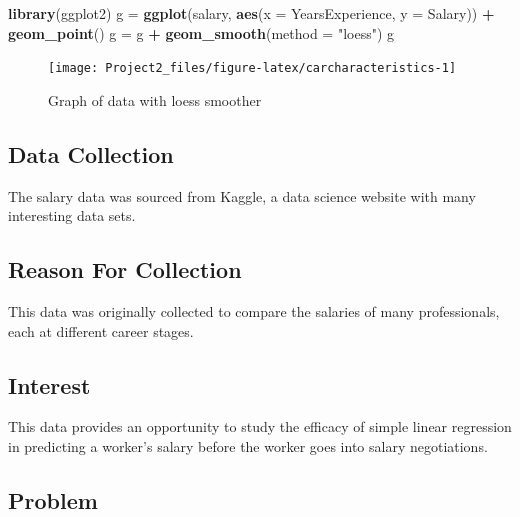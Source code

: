\documentclass[]{article}
\newenvironment{Shaded}{\begin{snugshade}}{\end{snugshade}}
\newcommand{\DataTypeTok}[1]{\textcolor[rgb]{0.13,0.29,0.53}{#1}}
\newcommand{\KeywordTok}[1]{\textcolor[rgb]{0.13,0.29,0.53}{\textbf{#1}}}
\newcommand{\NormalTok}[1]{#1}
\newcommand{\OperatorTok}[1]{\textcolor[rgb]{0.81,0.36,0.00}{\textbf{#1}}}
\newcommand{\StringTok}[1]{\textcolor[rgb]{0.31,0.60,0.02}{#1}}
\begin{document}
\begin{Shaded}
\begin{Highlighting}[]
\KeywordTok{library}\NormalTok{(ggplot2)}
\NormalTok{g =}\StringTok{ }\KeywordTok{ggplot}\NormalTok{(salary, }\KeywordTok{aes}\NormalTok{(}\DataTypeTok{x =}\NormalTok{ YearsExperience, }\DataTypeTok{y =}\NormalTok{ Salary)) }\OperatorTok{+}\StringTok{ }\KeywordTok{geom_point}\NormalTok{()}
\NormalTok{g =}\StringTok{ }\NormalTok{g }\OperatorTok{+}\StringTok{ }\KeywordTok{geom_smooth}\NormalTok{(}\DataTypeTok{method =} \StringTok{"loess"}\NormalTok{)}
\NormalTok{g}
\end{Highlighting}
\end{Shaded}

\begin{figure}

{\centering \texttt{[image: Project2\_files/figure-latex/carcharacteristics-1]} 

}

\caption{Graph of data with loess smoother}\label{fig:carcharacteristics}
\end{figure}

\hypertarget{data-collection}{%
\subsection{Data Collection}\label{data-collection}}

The salary data was sourced from Kaggle, a data science website with
many interesting data sets.

\hypertarget{reason-for-collection}{%
\subsection{Reason For Collection}\label{reason-for-collection}}

This data was originally collected to compare the salaries of many
professionals, each at different career stages.

\hypertarget{interest}{%
\subsection{Interest}\label{interest}}

This data provides an opportunity to study the efficacy of simple linear
regression in predicting a worker's salary before the worker goes into
salary negotiations.

\hypertarget{problem}{%
\subsection{Problem}\label{problem}}
\end{document}
